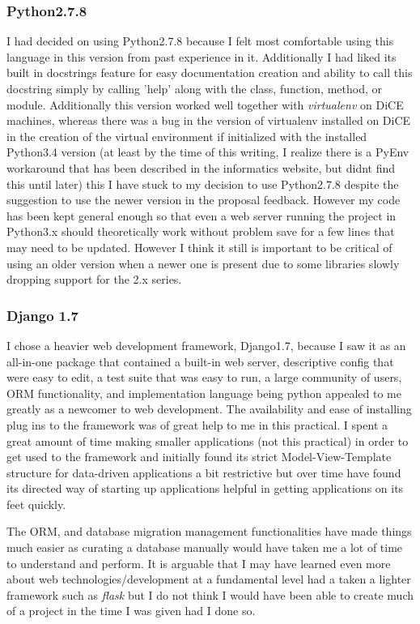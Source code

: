 \documentclass[11pt,a4paper]{article}
\begin{document}
\subsubsection{Python2.7.8}
I had decided on using Python2.7.8 because I felt most comfortable using this language in this version from past experience in it. Additionally I had liked its built in docstrings feature for easy documentation creation and ability to call this docstring simply by calling 'help' along with the class, function, method, or module. Additionally this version worked well together with \textit{virtualenv} on DiCE machines, whereas there was a bug in the version of virtualenv installed on DiCE in the creation of the virtual environment if initialized with the installed Python3.4 version (at least by the time of this writing, I realize there is a PyEnv workaround that has been described in the informatics website, but didnt find this until later) this I have stuck to my decision to use Python2.7.8 despite the suggestion to use the newer version in the proposal feedback. However my code has been kept general enough so that even a web server running the project in Python3.x should theoretically work without problem save for a few lines that may need to be updated. However I think it still is important to be critical of using an older version when a newer one is present due to some libraries slowly dropping support for the 2.x series.

\subsubsection{Django 1.7}
I chose a heavier web development framework, Django1.7, because I saw it as an all-in-one package that contained a built-in web server, descriptive config that were easy to edit, a test suite that was easy to run, a large community of users, ORM functionality, and implementation language being python appealed to me greatly as a newcomer to web development. The availability and ease of installing plug ins to the framework was of great help to me in this practical. I spent a great amount of time making smaller applications (not this practical) in order to get used to the framework and initially found its strict Model-View-Template structure for data-driven applications a bit restrictive but over time have found its directed way of starting up applications helpful in getting applications on its feet quickly.

The ORM, and database migration management functionalities have made things much easier as curating a database manually would have taken me a lot of time to understand and perform. It is arguable that I may have learned even more about web technologies/development at a fundamental level had a taken a lighter framework such as \textit{flask} but I do not think I would have been able to create much of a project in the time I was given had I done so.
\end{document}
